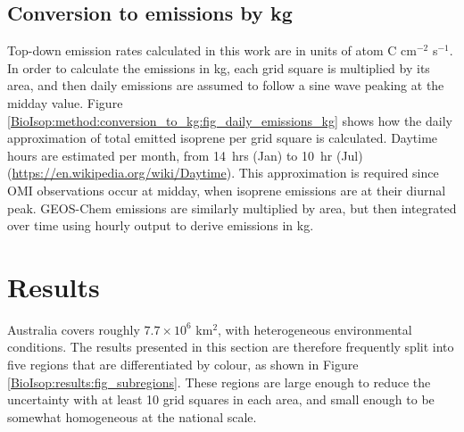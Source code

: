   \subsection{Conversion to emissions by kg}
    \label{BioIsop:method:conversion_to_kg}
    Top-down emission rates calculated in this work are in units of atom C cm$^{-2}$ s$^{-1}$.
    In order to calculate the emissions in kg, each grid square is multiplied by its area, and then daily emissions are assumed to follow a sine wave peaking at the midday value.
    Figure \ref{BioIsop:method:conversion_to_kg:fig_daily_emissions_kg} shows how the daily approximation of total emitted isoprene per grid square is calculated.
    Daytime hours are estimated per month, from 14~hrs (Jan) to 10~hr (Jul) (\url{https://en.wikipedia.org/wiki/Daytime}).
    This approximation is required since OMI observations occur at midday, when isoprene emissions are at their diurnal peak.
    GEOS-Chem emissions are similarly multiplied by area, but then integrated over time using hourly output to derive emissions in kg.
    
    
\section{Results}
  \label{BioIsop:results}
  
  Australia covers roughly $7.7 \times 10^6$ km$^{2}$, with heterogeneous environmental conditions.
  The results presented in this section are therefore frequently split into five regions that are differentiated by colour, as shown in Figure \ref{BioIsop:results:fig_subregions}.
  These regions are large enough to reduce the uncertainty with at least 10 grid squares in each area, and small enough to be somewhat homogeneous at the national scale.
  
  

